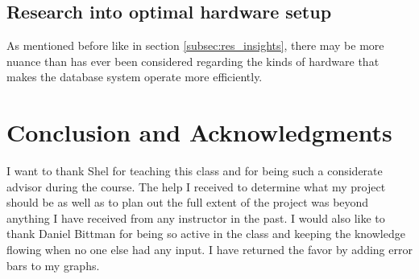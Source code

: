 \documentclass[twocolumn,11pt]{article}
\begin{document}
\subsection{Research into optimal hardware setup}

As mentioned before like in section \ref{subsec:res_insights}, there may be more
nuance than has ever been considered regarding the kinds of hardware that makes
the database system operate more efficiently.

\section{Conclusion and Acknowledgments}

I want to thank Shel for teaching this class and for being such a considerate
advisor during the course. The help I received to determine what my project
should be as well as to plan out the full extent of the project was beyond
anything I have received from any instructor in the past. I would also like to
thank Daniel Bittman for being so active in the class and keeping the knowledge
flowing when no one else had any input. I have returned the favor by adding
error bars to my graphs.



\end{document}
